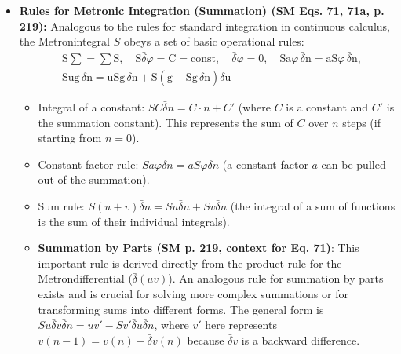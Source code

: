 \documentclass[12pt]{article}
\newcommand{\metronintegral}{S}
\newcommand{\metronenziffer}{n}
\begin{document}
\begin{itemize}
    \item \textbf{Rules for Metronic Integration (Summation) (SM Eqs. 71, 71a, p. 219):}
    Analogous to the rules for standard integration in continuous calculus, the Metronintegral \( \metronintegral \) obeys a set of basic operational rules:
    \begin{equation}
    \begin{aligned}
    & \mathrm{S}\sum = \sum\mathrm{S}, \quad \mathrm{S}\bar{\delta}\varphi = \mathrm{C} = \text{const}, \quad \bar{\delta}\varphi = 0, \quad \mathrm{S}\mathrm{a}\varphi\,\bar{\delta}\mathrm{n} = \mathrm{a}\mathrm{S}\varphi\,\bar{\delta}\mathrm{n}, \\
    & \mathrm{S}\mathrm{ug}\,\bar{\delta}\mathrm{n} = \mathrm{u}\mathrm{S}\mathrm{g}\,\bar{\delta}\mathrm{n} + \mathrm{S}(\mathrm{g} - \mathrm{S}\mathrm{g}\,\bar{\delta}\mathrm{n})\bar{\delta}\mathrm{u}
    \end{aligned} \tag{71}
    \end{equation}
    \begin{itemize}
        \item Integral of a constant: \( \metronintegral C \bar{\delta}\metronenziffer = C \cdot \metronenziffer + C' \) (where \( C \) is a constant and \( C' \) is the summation constant). This represents the sum of \( C \) over \( \metronenziffer \) steps (if starting from \(n=0\)).
        \item Constant factor rule: \( \metronintegral a\varphi \bar{\delta}\metronenziffer = a \metronintegral\varphi \bar{\delta}\metronenziffer \) (a constant factor \( a \) can be pulled out of the summation).
        \item Sum rule: \( \metronintegral(u+v)\bar{\delta}\metronenziffer = \metronintegral u \bar{\delta}\metronenziffer + \metronintegral v \bar{\delta}\metronenziffer \) (the integral of a sum of functions is the sum of their individual integrals).
        \item \textbf{Summation by Parts (SM p. 219, context for Eq. 71)}: This important rule is derived directly from the product rule for the Metrondifferential (\( \bar{\delta}(uv) \)). An analogous rule for summation by parts exists and is crucial for solving more complex summations or for transforming sums into different forms. The general form is \( \metronintegral u \bar{\delta} v \bar{\delta}\metronenziffer = uv' - \metronintegral v' \bar{\delta} u \bar{\delta}\metronenziffer \), where \( v' \) here represents \( v(\metronenziffer-1) = v(\metronenziffer) - \bar{\delta} v(\metronenziffer) \) because \( \bar{\delta} v \) is a backward difference.

\end{itemize}
\end{itemize}
\end{document}
